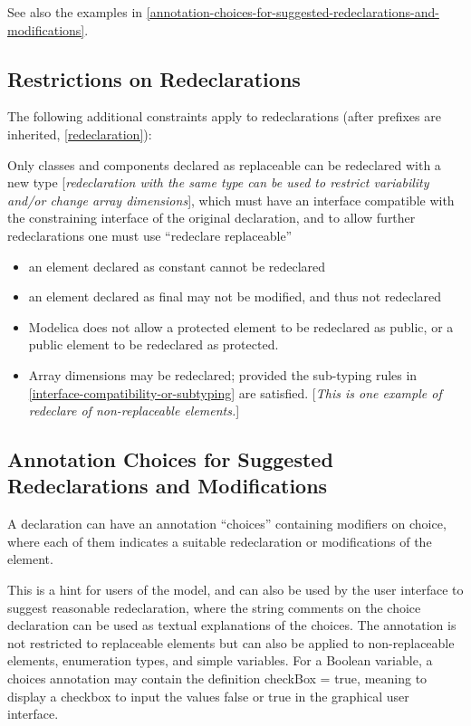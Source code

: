 See also the examples in \ref{annotation-choices-for-suggested-redeclarations-and-modifications}.

\subsection{Restrictions on Redeclarations}

The following additional constraints apply to redeclarations (after
prefixes are inherited, \ref{redeclaration}):

Only classes and components declared as replaceable can be redeclared
with a new type {[}\emph{redeclaration with the same type can be used to
restrict variability and/or change array dimensions}{]}, which must have
an interface compatible with the constraining interface of the original
declaration, and to allow further redeclarations one must use
``redeclare replaceable''

\begin{itemize}
\item
  an element declared as constant cannot be redeclared
\item
  an element declared as final may not be modified, and thus not
  redeclared
\item
  Modelica does not allow a protected element to be redeclared as
  public, or a public element to be redeclared as protected.
\item
  Array dimensions may be redeclared; provided the sub-typing rules in
  \ref{interface-compatibility-or-subtyping} are satisfied. {[}\emph{This is one example of redeclare of
  non-replaceable elements.}{]}
\end{itemize}

\subsection{Annotation Choices for Suggested Redeclarations and Modifications}

A declaration can have an annotation ``choices'' containing modifiers on
choice, where each of them indicates a suitable redeclaration or
modifications of the element.

This is a hint for users of the model, and can also be used by the user
interface to suggest reasonable redeclaration, where the string comments
on the choice declaration can be used as textual explanations of the
choices. The annotation is not restricted to replaceable elements but
can also be applied to non-replaceable elements, enumeration types, and
simple variables. For a Boolean variable, a choices annotation may
contain the definition checkBox = true, meaning to display a checkbox to
input the values false or true in the graphical user interface.

